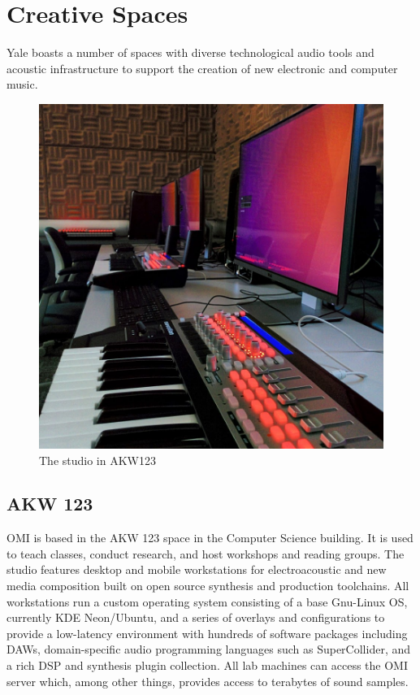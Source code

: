 \section{Creative Spaces}

Yale boasts a number of spaces with diverse technological audio tools and acoustic infrastructure to support the creation of new electronic and computer music.

\begin{figure}[h]
    \centering
    \includegraphics[width=0.85\columnwidth]{figs/euterpeastudio.png}
    \caption{The studio in AKW123}
    \label{fig:AKW123}
\end{figure}

\subsection{AKW 123}
OMI is based in the AKW 123 space in the Computer Science building. It is used to teach classes, conduct research, and host workshops and reading groups. The studio features desktop and mobile workstations for electroacoustic and new media composition built on open source synthesis and production toolchains. All workstations run a custom operating system consisting of a base Gnu-Linux OS, currently KDE Neon/Ubuntu, and a series of overlays and configurations to provide a low-latency environment with hundreds of software packages including DAWs, domain-specific audio programming languages such as SuperCollider, and a rich DSP and synthesis plugin collection. All lab machines can access the OMI server which, among other things, provides access to terabytes of sound samples.

